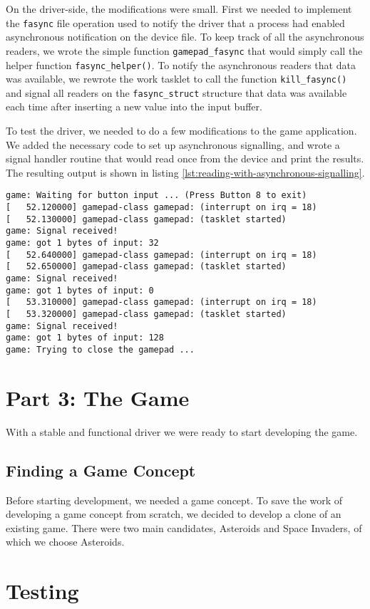 On the driver-side, the modifications were small. First we needed to implement the \texttt{fasync} file operation used to notify the driver that a process had enabled asynchronous notification on the device file. To keep track of all the asynchronous readers, we wrote the simple function \texttt{gamepad\_fasync} that would simply call the helper function \texttt{fasync\_helper()}. To notify the asynchronous readers that data was available, we rewrote the work tasklet to call the function \texttt{kill\_fasync()} and signal all readers on the \texttt{fasync\_struct} structure that data was available each time after inserting a new value into the input buffer.

To test the driver, we needed to do a few modifications to the game application. We added the necessary code to set up asynchronous signalling, and wrote a signal handler routine that would read once from the device and print the results. The resulting output is shown in listing \ref{lst:reading-with-asynchronous-signalling}.
\begin{lstlisting}[caption=Reading with asynchronous signalling.,label=lst:reading-with-asynchronous-signalling]
game: Waiting for button input ... (Press Button 8 to exit)
[   52.120000] gamepad-class gamepad: (interrupt on irq = 18)
[   52.130000] gamepad-class gamepad: (tasklet started)
game: Signal received!
game: got 1 bytes of input: 32
[   52.640000] gamepad-class gamepad: (interrupt on irq = 18)
[   52.650000] gamepad-class gamepad: (tasklet started)
game: Signal received!
game: got 1 bytes of input: 0
[   53.310000] gamepad-class gamepad: (interrupt on irq = 18)
[   53.320000] gamepad-class gamepad: (tasklet started)
game: Signal received!
game: got 1 bytes of input: 128
game: Trying to close the gamepad ...
\end{lstlisting}



\section{Part 3: The Game}
With a stable and functional driver we were ready to start developing the game.

\subsection{Finding a Game Concept}
Before starting development, we needed a game concept. To save the work of developing a game concept from scratch, we decided to develop a clone of an existing game. There were two main candidates, Asteroids and Space Invaders, of which we choose Asteroids.




\section{Testing}
